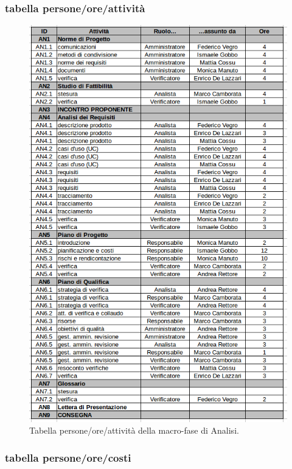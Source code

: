 \newpage
\subsubsection{tabella persone/ore/attività}

\begin{figure}[h]
\begin{center}
\includegraphics[scale=0.50]{img/analisi-attivita.png}
\caption{Tabella persone/ore/attività della macro-fase di Analisi.}
\end{center}
\end{figure}
\clearpage

\subsubsection{tabella persone/ore/costi}

